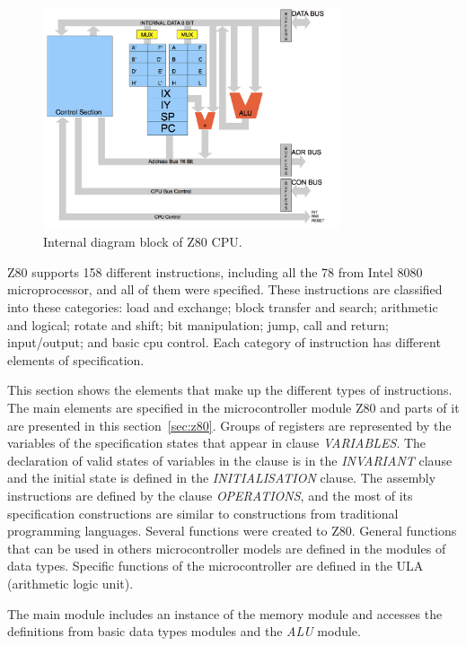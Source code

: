 \documentclass[11pt]{article} %
\begin{document}
\begin{figure}[h] \centering
\includegraphics[width=0.78\textwidth]{images/Architecture.png}
\caption{Internal diagram block of Z80 CPU.}
\label{fig:DiagramBlock}
\end{figure}


Z80 supports 158 different instructions, including all the 78 from Intel 8080
microprocessor, and all of them were specified. These instructions are classified
into these categories: load and exchange; block transfer and search; arithmetic
and logical; rotate and shift; bit manipulation; jump, call and return;
input/output; and basic cpu control. Each category of instruction has different
elements of specification.



This section shows the elements that make up the different types of instructions.
The main elements are specified in the microcontroller module Z80 and parts of it
are presented in this section~\ref{sec:z80}. Groups of registers are represented
by the variables of the specification states that appear in clause
\textit{VARIABLES}. The declaration of valid states of variables in the clause is
in the \textit{INVARIANT} clause and the initial state is defined in the
\textit{INITIALISATION} clause. The assembly instructions are defined by the
clause \textit{OPERATIONS}, and the most of its specification constructions are
similar to constructions from traditional programming languages. Several
functions were created to Z80. General functions that can be used in others
microcontroller models are defined in the modules of data types. Specific
functions of the microcontroller are defined in the ULA (arithmetic logic unit).



The main module includes an instance of the memory module and accesses the definitions from basic data
types modules and the \textit{ALU} module.
\end{document}
